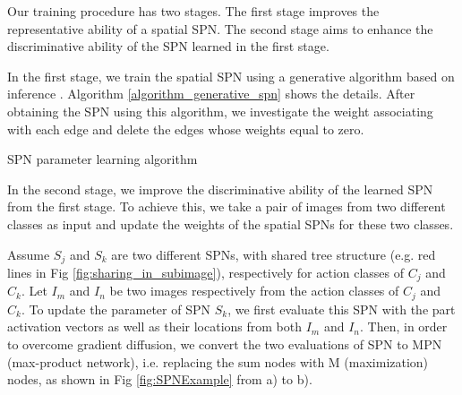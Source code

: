\documentclass[journal]{IEEEtran}
\begin{document}
Our training procedure has two stages. The first stage improves the representative ability of a spatial SPN. The second stage aims to enhance the discriminative ability of the SPN learned in the first stage.


In the first stage, we train the spatial SPN using a generative algorithm based on inference \cite{poon2011SPNIntroduce}. Algorithm \ref{algorithm_generative_spn} shows the details. After obtaining the SPN using this algorithm, we investigate the weight associating with each edge and delete the edges whose weights equal to zero.



\begin{algorithm}[h]

	\caption{SPN parameter learning algorithm}
	\label{algorithm_generative_spn}
\end{algorithm}


In the second stage, we improve the discriminative ability of the learned SPN from the first stage. To achieve this, we take a pair of images from two different classes as input and update the weights of the spatial SPNs for these two classes.


Assume $ S_j $ and $ S_k $ are two different SPNs, with shared tree structure (e.g. red lines in Fig \ref{fig:sharing_in_subimage}), respectively for action classes of $ C_j $ and $ C_k $. Let $ I_m $ and $ I_n $ be two images respectively from the action classes of $ C_j $ and $ C_k $. To update the parameter of SPN $ S_k $, we first evaluate this SPN with the part activation vectors as well as their locations from both $ I_m $ and $ I_n $. Then, in order to overcome gradient diffusion, we convert the two evaluations of SPN to MPN (max-product network), i.e. replacing the sum nodes with M (maximization) nodes, as shown in Fig \ref{fig:SPNExample} from a) to b).
\end{document}
